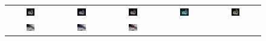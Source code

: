 \begin{figure}[t]
\begin{tabular}{@{}ccccc@{}}
\\
\includegraphics[width=0.19\textwidth]{images/L2S_compare_region/muscle_orig}	&
\includegraphics[width=0.19\textwidth]{images/L2S_compare_region/muscle_CV}	&
\includegraphics[width=0.19\textwidth]{images/L2S_compare_region/muscle_Lankton}		&
\includegraphics[width=0.19\textwidth]{images/L2S_compare_region/muscle_Li}	&
\includegraphics[width=0.19\textwidth]{images/L2S_compare_region/muscle_ours}	
\\
\includegraphics[width=0.19\textwidth]{images/L2S_compare_region/US3_orig}	&
\includegraphics[width=0.19\textwidth]{images/L2S_compare_region/US3_CV}	&
\includegraphics[width=0.19\textwidth]{images/L2S_compare_region/US3_Lankton} &

\end{tabular}
\end{figure}
